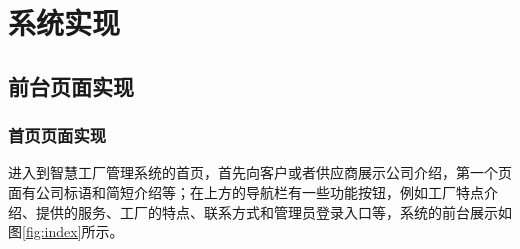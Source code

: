 \section{系统实现}

\subsection{前台页面实现}

\subsubsection{首页页面实现}

进入到智慧工厂管理系统的首页，首先向客户或者供应商展示公司介绍，第一个页面有公司标语和简短介绍等；在上方的导航栏有一些功能按钮，例如工厂特点介绍、提供的服务、工厂的特点、联系方式和管理员登录入口等，系统的前台展示如图\ref{fig:index}所示。

